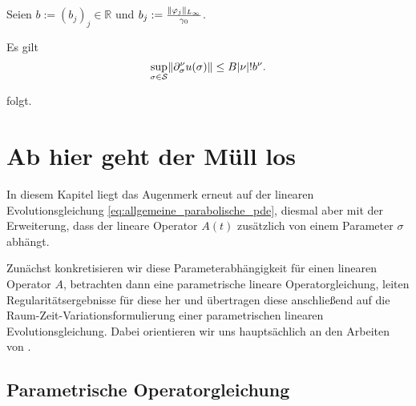 Seien $b := (b_{j})_{j} \in \mathbb{R}$ und $b_{j} := \frac{\lVert\varphi_{j}\rVert_{L_{\infty}}}{\gamma_{0}}$.

\begin{Satz}
    Es gilt
    \begin{equation}
        \sup_{\sigma \in \mathcal S} \lVert\partial^{\nu}_{\sigma} u(\sigma)\rVert \leq B \lvert\nu\rvert! b^{\nu}.
    \end{equation}

    \begin{Beweis}
        folgt.
    \end{Beweis}
\end{Satz}





\chapter{Ab hier geht der Müll los} %
\label{cha:ab_hier_geht_der_m_ll_los}




In diesem Kapitel liegt das Augenmerk erneut auf der linearen Evolutionsgleichung \eqref{eq:allgemeine_parabolische_pde}, diesmal aber mit der Erweiterung, dass der lineare Operator $A(t)$ zusätzlich von einem Parameter $\sigma$ abhängt.

Zunächst konkretisieren wir diese Parameterabhängigkeit für einen linearen Operator $A$, betrachten dann eine parametrische lineare Operatorgleichung, leiten Regularitätsergebnisse für diese her und übertragen diese anschließend auf die Raum-Zeit-Variationsformulierung einer parametrischen linearen Evolutionsgleichung.
Dabei orientieren wir uns hauptsächlich an den Arbeiten von \textcite{Kunoth:2013ef,Cohen:2010kz}.

\section{Parametrische Operatorgleichung} %
\label{sec:parametrische_operatorgleichung}

